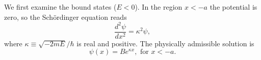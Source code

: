 \documentclass{article}
\begin{document}
We first examine the bound states ($E < 0$). In the region $x < -a$ the
potential is zero, so the Sch\"{o}rdinger equation reads
\begin{equation} \label{eq:fin-sq-well-1}
  \frac{d^2\psi}{dx^2} = \kappa^2\psi,
\end{equation}
where $\kappa \equiv \sqrt{-2mE}/\hbar$ is real and positive. The physically
admissible solution is
\begin{equation} \label{eq:fin-sq-well-2}
  \psi(x) = Be^{\kappa x}, \text{ for } x < -a.
\end{equation}
\end{document}
